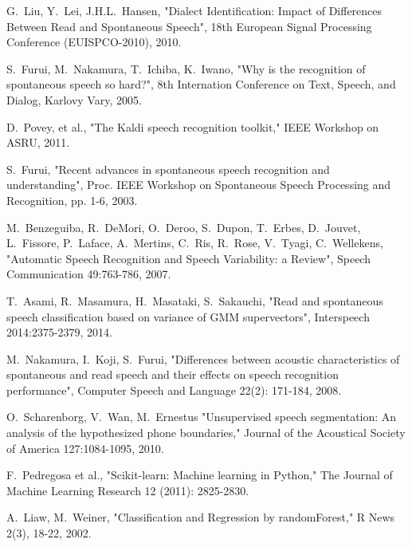 \documentclass[conference]{IEEEtran}
\begin{document}
\begin{thebibliography}{1}
G.~Liu, Y.~Lei, J.H.L.~Hansen,
    "Dialect Identification: Impact of Differences Between Read and Spontaneous Speech",
    18th European Signal Processing Conference (EUISPCO-2010), 2010.

S.~Furui, M.~Nakamura, T.~Ichiba, K.~Iwano,
	"Why is the recognition of spontaneous speech so hard?",
	8th Internation Conference on Text, Speech, and Dialog,
	Karlovy Vary, 2005.

D.~Povey, et al.,
    "The Kaldi speech recognition toolkit,"
    IEEE Workshop on ASRU, 2011.

S.~Furui,
    "Recent advances in spontaneous speech recognition and understanding",
    Proc. IEEE Workshop on Spontaneous Speech Processing and Recognition, pp. 1-6, 2003.

M.~Benzeguiba, R.~DeMori, O.~Deroo, S.~Dupon, T.~Erbes, D.~Jouvet, L.~Fissore, P.~Laface, A.~Mertins, C.~Ris, R.~Rose, V.~Tyagi, C.~Wellekens,
	"Automatic Speech Recognition and Speech Variability: a Review",
	Speech Communication 49:763-786, 2007.

T.~Asami, R.~Masamura, H.~Masataki, S.~Sakauchi,
    "Read and spontaneous speech classification based on variance of GMM supervectors",
	Interspeech 2014:2375-2379, 2014.

M.~Nakamura, I.~Koji, S.~Furui,
    "Differences between acoustic characteristics of spontaneous and read speech and their effects on speech recognition performance",
    Computer Speech and Language 22(2): 171-184, 2008.

O.~Scharenborg, V.~Wan, M.~Ernestus
    "Unsupervised speech segmentation: An analysis of the hypothesized phone boundaries,"
    Journal of the Acoustical Society of America 127:1084-1095, 2010.

F.~Pedregosa et al.,
    "Scikit-learn: Machine learning in Python,"
    The Journal of Machine Learning Research 12 (2011): 2825-2830.

A.~Liaw, M.~Weiner,
    "Classification and Regression by randomForest,"
    R News 2(3), 18-22, 2002.

\end{thebibliography}



\end{document}
